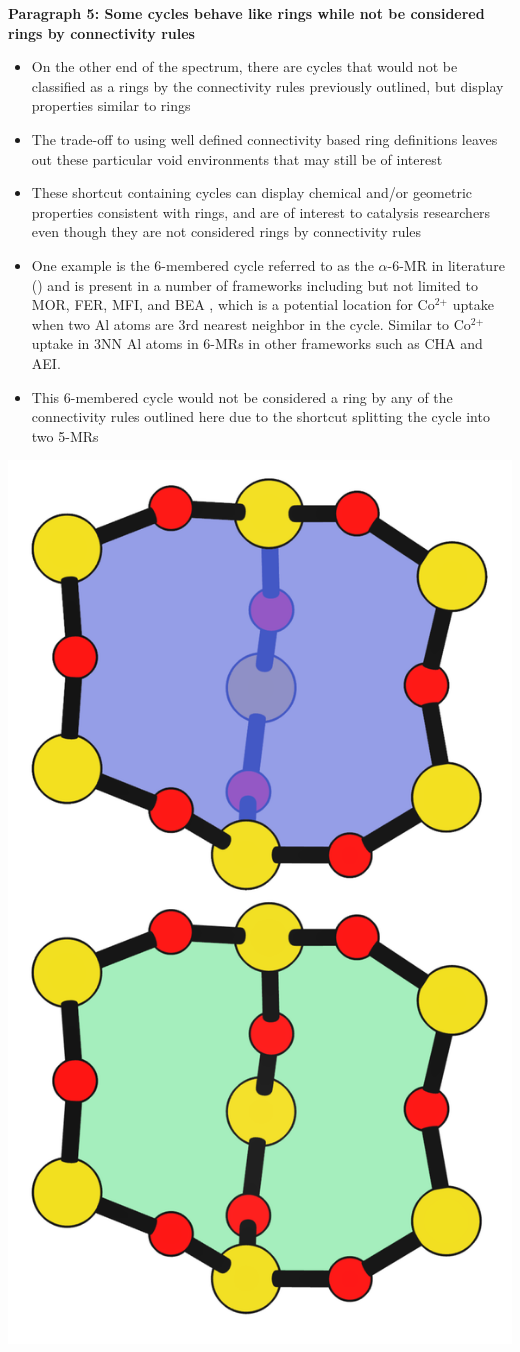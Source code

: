 \documentclass[11pt]{article}
\begin{document}
\textbf{\textbf{Paragraph 5: Some cycles behave like rings while not be considered rings by connectivity rules}} 
\begin{itemize}
\item On the other end of the spectrum, there are cycles that would not be classified as a rings by the connectivity rules previously outlined, but display properties similar to rings
\item The trade-off to using well defined connectivity based ring definitions leaves out these particular void environments that may still be of interest
\item These shortcut containing cycles can display chemical and/or geometric properties consistent with rings, and are of interest to catalysis researchers even though they are not considered rings by connectivity rules
\item One example is the 6-membered cycle referred to as the \(\alpha\)-6-MR in literature () and is present in a number of frameworks including but not limited to  MOR, FER, MFI, and BEA \cite{dedecek-siting-2012,bernauer-proton-2016}, which is a potential location for Co\(^{\text{2+}}\) uptake when two Al atoms are 3rd nearest neighbor in the cycle. Similar to Co\(^{\text{2+}}\) uptake in 3NN Al atoms in 6-MRs in other frameworks such as CHA and AEI.
\item This 6-membered cycle would not be considered a ring by any of the connectivity rules outlined here due to the shortcut splitting the cycle into two 5-MRs
\end{itemize}

\begin{center}
\includegraphics[width=.4\textwidth]{../figures/completed-figures/MFI-6MC.pdf}
\end{center}
\end{document}
